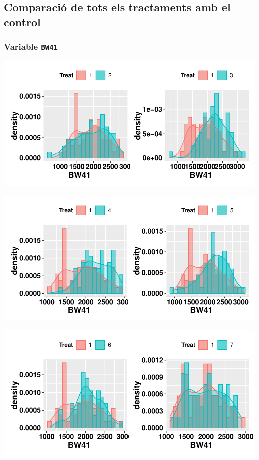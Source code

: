 \documentclass[11pt,a4paper]{article}\usepackage[]{graphicx}\usepackage[]{color}
\makeatletter
\def\maxwidth{ %
  \ifdim\Gin@nat@width>\linewidth
    \linewidth
  \else
    \Gin@nat@width
  \fi
}
\newenvironment{knitrout}{}{} %
\makeatother
\begin{document}
\clearpage
\subsection{Comparació de tots els tractaments amb el control}



\subsubsection{Variable \texttt{BW41}}
\begin{knitrout}
\color{fgcolor}
\includegraphics[width=\maxwidth]{figure/unnamed-chunk-10-1} 

\includegraphics[width=\maxwidth]{figure/unnamed-chunk-10-2} 

\includegraphics[width=\maxwidth]{figure/unnamed-chunk-10-3} 


\end{knitrout}
\end{document}
